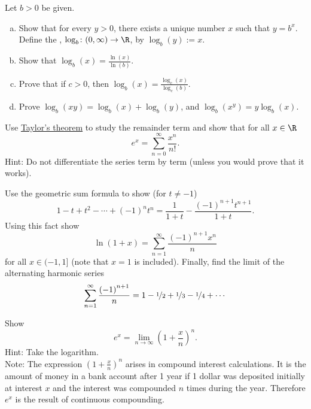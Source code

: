 \documentclass[12pt]{book}
\begin{document}
\begin{exercise}
Let $b > 0$ be given.
\begin{enumerate}[a)]
 \item Show that for every $y > 0$, there exists a unique number $x$
such that $y = b^x$.
Define
the \emph{},
$\log_b \colon (0,\infty) \to \R$, by
$\log_b(y) := x$.
 \item Show that $\log_b(x) = \frac{\ln(x)}{\ln(b)}$.
  \item Prove that if $c > 0$, then
$\log_b(x) = \frac{\log_c(x)}{\log_c(b)}$.
   \item Prove $\log_b(xy) =
\log_b(x)+\log_b(y)$, and $\log_b(x^y) = y \log_b(x)$.
\end{enumerate}
\end{exercise}

\begin{exercise}
Use \hyperref[thm:taylor]{Taylor's theorem} to study the remainder term and show that for
all $x \in \R$
\begin{equation*}
e^x = \sum_{n=0}^\infty \frac{x^n}{n!} .
\end{equation*}
Hint: Do not differentiate the series term by term (unless you would prove that it
works).
\end{exercise}

\begin{exercise}
Use the geometric sum formula to show (for $t\not= -1$)
\begin{equation*}
1-t+t^2-\cdots+{(-1)}^n t^n = \frac{1}{1+t} - \frac{{(-1)}^{n+1}t^{n+1}}{1+t}.
\end{equation*}
Using this fact show
\begin{equation*}
\ln (1+x) = \sum_{n=1}^\infty \frac{{(-1)}^{n+1}x^n}{n} 
\end{equation*}
for all $x \in (-1,1]$ (note that $x=1$ is included).
Finally,
find the limit of the alternating harmonic series
\begin{equation*}
\sum_{n=1}^\infty \frac{{(-1)}^{n+1}}{n} = 1 - \nicefrac{1}{2} +
\nicefrac{1}{3} - \nicefrac{1}{4} + \cdots
\end{equation*}

\begin{exercise}
Show 
\begin{equation*}
e^x = \lim_{n\to\infty} {\left( 1 + \frac{x}{n} \right)}^n .
\end{equation*}
Hint: Take the logarithm.\\
Note: The expression 
${\left( 1 + \frac{x}{n} \right)}^n$ arises in compound interest
calculations.
It is the amount of money in a bank account after 1 year
if 1 dollar was deposited initially at interest $x$
and the interest was compounded $n$
times during the year.
Therefore $e^x$ is the result of continuous
compounding.
\end{exercise}

\end{exercise}
\end{document}
